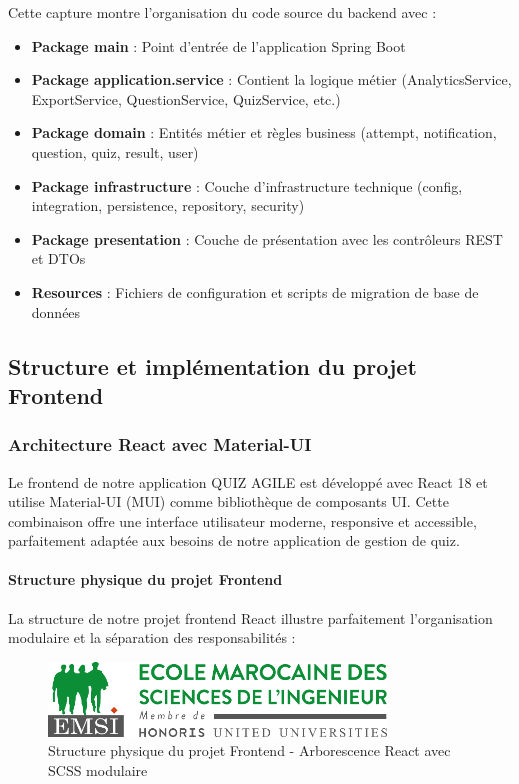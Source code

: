 \documentclass[12pt,a4paper]{report}
\begin{document}
Cette capture montre l'organisation du code source du backend avec :
\begin{itemize}
\item \textbf{Package main} : Point d'entrée de l'application Spring Boot
\item \textbf{Package application.service} : Contient la logique métier (AnalyticsService, ExportService, QuestionService, QuizService, etc.)
\item \textbf{Package domain} : Entités métier et règles business (attempt, notification, question, quiz, result, user)
\item \textbf{Package infrastructure} : Couche d'infrastructure technique (config, integration, persistence, repository, security)
\item \textbf{Package presentation} : Couche de présentation avec les contrôleurs REST et DTOs
\item \textbf{Resources} : Fichiers de configuration et scripts de migration de base de données
\end{itemize}

\subsection{Structure et implémentation du projet Frontend}

\subsubsection{Architecture React avec Material-UI}

Le frontend de notre application QUIZ AGILE est développé avec React 18 et utilise Material-UI (MUI) comme bibliothèque de composants UI. Cette combinaison offre une interface utilisateur moderne, responsive et accessible, parfaitement adaptée aux besoins de notre application de gestion de quiz.

\paragraph{Structure physique du projet Frontend}

La structure de notre projet frontend React illustre parfaitement l'organisation modulaire et la séparation des responsabilités :

\begin{figure}[H]
\centering
\includegraphics[width=0.8\textwidth]{latex_media/media/structure_frontend_react.png}
\caption{Structure physique du projet Frontend - Arborescence React avec SCSS modulaire}
\label{fig:structure-frontend}
\end{figure}
\end{document}
